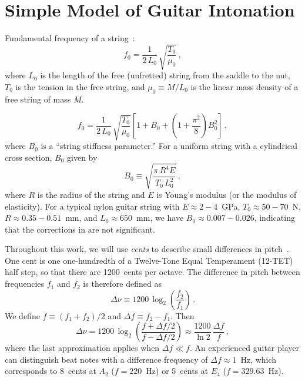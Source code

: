 %
%
%

 \section{Simple Model of Guitar Intonation\label{sct:model}}

Fundamental frequency of a string~\cite{ref:morse1981vas,ref:morse1981vsa}:
 \begin{equation} \label{eqn:f_0_def}
f_0 = \frac{1}{2\, L_0}\, \sqrt{\frac{T_0}{\mu_0}}\, ,
 \end{equation}
where $L_0$ is the length of the free (unfretted) string from the saddle to the nut, $T_0$ is the tension in the free string, and $\mu_0 \equiv M / L_0$ is the linear mass density of a free string of mass $M$.

 \begin{equation} \label{eqn:f_0_stiff}
f_0 = \frac{1}{2\, L_0}\, \sqrt{\frac{T_0}{\mu_0}} \left[ 1 + B_0 + \left(1 + \frac{\pi^2}{8}\right) B_0^2 \right]\, ,
 \end{equation}
where $B_0$ is a ``string stiffness parameter.'' For a uniform string with a cylindrical cross section, $B_0$ given by~\cite{ref:morse1981vsb}
 \begin{equation} \label{eqn:b_def}
B_0 \equiv \sqrt{\frac{\pi\, R^4 E}{T_0\, L_0^2}}\, ,
 \end{equation}
where $R$ is the radius of the string and $E$ is Young's modulus (or the modulus of elasticity). For a typical nylon guitar string with $E \approx 2 - 4$~GPa, $T_0 \approx 50 - 70$~N, $R \approx 0.35 - 0.51$~mm, and $L_0 \approx 650$~mm, we have $B_0 \approx 0.007 - 0.026$, indicating that the corrections in  are not significant.

Throughout this work, we will use \emph{cents} to describe small differences in pitch~\cite{ref:durfee2015pms}. One cent is one one-hundredth of a Twelve-Tone Equal Temperament (12-TET) half step, so that there are 1200~cents per octave. The difference in pitch between frequencies $f_1$ and $f_2$ is therefore defined as
 \begin{equation} \label{eqn:cents_def}
\Delta \nu \equiv 1200\, \log_2\left(\frac{f_2}{f_1}\right)\, .
 \end{equation}
We define $f \equiv (f_1 + f_2) / 2$ and $\Delta f \equiv f_2 - f_1$. Then
 \begin{equation} \label{eqn:cents_approx}
\Delta \nu = 1200\, \log_2\left(\frac{f + \Delta f / 2}{f - \Delta f /2}\right) \approx \frac{1200}{\ln 2}\, \frac{\Delta f}{f}\, ,
 \end{equation}
where the last approximation applies when $\Delta f \ll f$. An experienced guitar player can distinguish beat notes with a difference frequency of $\Delta f \approx 1$~Hz, which corresponds to 8~cents at $A_2$ ($f = 220$~Hz) or 5~cents at $E_4$ ($f = 329.63$~Hz).

